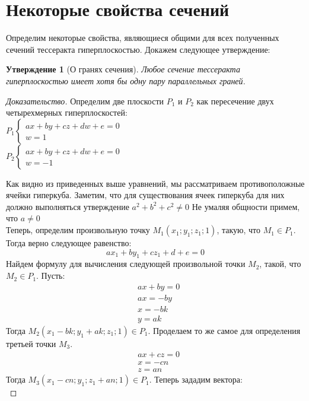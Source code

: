 \documentclass[12pt, a4paper, twoside]{report}
\newtheorem{lem}{Утверждение} %
\begin{document}
\section{Некоторые свойства сечений}
Определим некоторые свойства, являющиеся общими для всех полученных сечений тессеракта гиперплоскостью. Докажем следующее утверждение:
\begin{lem}[О гранях сечения]
	Любое сечение тессеракта гиперплоскостью имеет хотя бы одну пару параллельных граней.
\end{lem}
\begin{proof}[Доказательство] 
	Определим две плоскости $P_1$ и $P_2$ как пересечение двух четырехмерных гиперплоскостей: \\

$
\begin{equation}
	P_1 \left\{
		\begin{array}{lc}
			ax+by+cz+dw+e=0 \\
			w=1
		\end{array}
\end{equation}
$
\\

$
\begin{equation}
	P_2 \left\{
		\begin{array}{lc}
			ax+by+cz+dw+e=0 \\
			w=-1
		\end{array}
	\end{equation}
$

Как видно из приведенных выше уравнений, мы рассматриваем противоположные ячейки гиперкуба. 
Заметим, что для существования ячеек гиперкуба для них должно выполняться утверждение $a^2+b^2+c^2\ne0$ 
Не умаляя общности примем, что $a\ne 0$ \\
Теперь, определим произвольную точку $M_1(x_1;y_1;z_1;1)$, такую, что $M_1\in P_1$. Тогда верно следующее равенство:
$$
ax_1+by_1+cz_1+d+e=0
$$
Найдем формулу для вычисления следующей произвольной точки $M_2$, такой, что $M_2 \in P_1$. Пусть: \\
\begin{align*}
	&ax+by=0 \\ 
&ax=-by \\
&x=-bk \\
&y=ak 
\end{align*}
Тогда $M_2(x_1-bk;y_1+ak;z_1;1) \in P_1.$ Проделаем то же самое для определения третьей точки $M_3$. \\
\begin{align*}
	&ax+cz=0 \\
 &x=-cn \\
 &z=an
\end{align*}
Тогда $M_3(x_1-cn;y_1;z_1+an;1) \in P_1$. 
\newpage
Теперь зададим вектора:\\ 


\end{proof}
\end{document}
